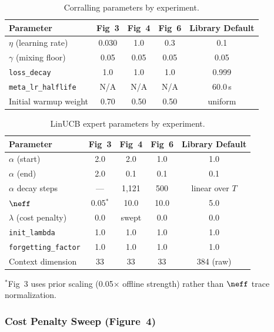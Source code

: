 \begin{table}[h]
\centering
\caption{Corralling parameters by experiment.}
\label{tab:corralling_expt}
\small
\begin{tabular}{@{}lcccc@{}}
\toprule
\textbf{Parameter} & \textbf{Fig~3} & \textbf{Fig~4} & \textbf{Fig~6} & \textbf{Library Default} \\
\midrule
$\eta$ (learning rate) & 0.030 & 1.0 & 0.3 & 0.1 \\
$\gamma$ (mixing floor) & 0.05 & 0.05 & 0.05 & 0.05 \\
\texttt{loss\_decay} & 1.0 & 1.0 & 1.0 & 0.999 \\
\texttt{meta\_lr\_halflife} & N/A & N/A & N/A & 60.0\,s \\
Initial warmup weight & 0.70 & 0.50 & 0.50 & uniform \\
\bottomrule
\end{tabular}
\end{table}

\begin{table}[h]
\centering
\caption{LinUCB expert parameters by experiment.}
\label{tab:linucb_expt}
\small
\begin{tabular}{@{}lcccc@{}}
\toprule
\textbf{Parameter} & \textbf{Fig~3} & \textbf{Fig~4} & \textbf{Fig~6} & \textbf{Library Default} \\
\midrule
$\alpha$ (start) & 2.0 & 2.0 & 1.0 & 1.0 \\
$\alpha$ (end) & 2.0 & 0.1 & 0.1 & 0.1 \\
$\alpha$ decay steps & --- & 1,121 & 500 & linear over $T$ \\
$\neff$ & 0.05$^*$ & 10.0 & 10.0 & 5.0 \\
$\lambda$ (cost penalty) & 0.0 & swept & 0.0 & 0.0 \\
\texttt{init\_lambda} & 1.0 & 1.0 & 1.0 & 1.0 \\
\texttt{forgetting\_factor} & 1.0 & 1.0 & 1.0 & 1.0 \\
Context dimension & 33 & 33 & 33 & 384 (raw) \\
\bottomrule
\end{tabular}
\vspace{0.3em}

\footnotesize
$^*$Fig~3 uses prior scaling (0.05$\times$ offline strength) rather than $\neff$ trace normalization.
\end{table}

\subsubsection{Cost Penalty Sweep (Figure~4)}

